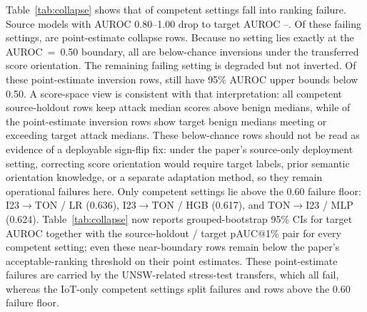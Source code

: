 \documentclass[10pt,conference]{IEEEtran}
\begin{document}


Table~\ref{tab:collapse} shows that \CompetentRankingFailureCount{} of \CompetentSettingCount{} competent settings fall into ranking failure. Source models with AUROC 0.80--1.00 drop to target AUROC \CompetentMinTargetAuroc{}--\CompetentMaxTargetAuroc{}. Of these failing settings, \CompetentCollapseCount{} are point-estimate collapse rows. Because no setting lies exactly at the AUROC~=~0.50 boundary, all \CompetentCollapseCount{} are below-chance inversions under the transferred score orientation. The remaining failing setting is degraded but not inverted. Of these point-estimate inversion rows, \CompetentRobustInversionCount{} still have 95\% AUROC upper bounds below 0.50. A score-space view is consistent with that interpretation: all \CompetentSourcePositiveMedianGapCount{} competent source-holdout rows keep attack median scores above benign medians, while \CompetentInversionMedianCrossoverCount{} of the \CompetentInversionCount{} point-estimate inversion rows show target benign medians meeting or exceeding target attack medians. These below-chance rows should not be read as evidence of a deployable sign-flip fix: under the paper's source-only deployment setting, correcting score orientation would require target labels, prior semantic orientation knowledge, or a separate adaptation method, so they remain operational failures here. Only \CompetentNonCollapsedCount{} competent settings lie above the 0.60 failure floor: I23$\to$TON / LR (0.636), I23$\to$TON / HGB (0.617), and TON$\to$I23 / MLP (0.624). Table~\ref{tab:collapse} now reports grouped-bootstrap 95\% CIs for target AUROC together with the source-holdout / target pAUC@1\% pair for every competent setting; even these near-boundary rows remain below the paper's acceptable-ranking threshold on their point estimates.
These point-estimate failures are carried by the \CompetentUnswStressTestSettingCount{} UNSW-related stress-test transfers, which all fail, whereas the \CompetentIotOnlySettingCount{} IoT-only competent settings split \CompetentIotOnlyRankingFailureCount{} failures and \CompetentIotOnlyNonCollapsedCount{} rows above the 0.60 failure floor.
\end{document}
